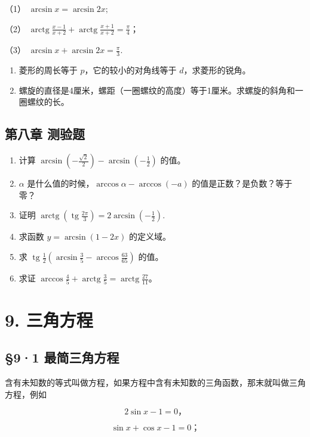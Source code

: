 （1） \(\arcsin x = \arcsin 2x;\)

（2）
\(\operatorname{arctg} \frac{x - 1}{x + 2} + \operatorname{arctg} \frac{x + 1}{x + 2} = \frac{\pi}{4}\)；

（3） \(\arcsin x + \arcsin 2x = \frac{\pi}{3}\).

\begin{enumerate}[start=8]
\item
  菱形的周长等于 \(p\)，它的较小的对角线等于 \(d\)，求菱形的锐角。
\item
  螺旋的直径是4厘米，螺距（一圈螺纹的高度）等于1厘米。求螺旋的斜角和一圈螺纹的长。
\end{enumerate}

\section{第八章 测验题}

\begin{enumerate}
\item
  计算
  \(\arcsin\left(-\frac{\sqrt{2}}{2}\right)-\arcsin\left(-\frac{1}{2}\right)\)
  的值。
\item
  \(\alpha\) 是什么值的时候，\(\arccos \alpha - \arccos (-a)\)
  的值是正数？是负数？等于零？
\item
  证明
  \(\operatorname{arctg}\left(\operatorname{tg}\frac{2\pi}{3}\right) = 2\arcsin\left(-\frac{1}{2}\right)\).
\item
  求函数 \(y = \arcsin(1 - 2x)\) 的定义域。
\item
  求
  \(\operatorname{tg} \frac{1}{2} (\arcsin \frac{3}{5} - \arccos \frac{63}{65})\)
  的值。
\item
  求证
  \(\arccos\frac45+\operatorname{arctg}\frac35=\operatorname{arctg}\frac{27}{11}\)。
\end{enumerate}

\chapter{9. 三角方程}

\section{§9·1 最简三角方程}

含有未知数的等式叫做方程，如果方程中含有未知数的三角函数，那末就叫做三角方程，例如

\[
2 \sin x - 1 = 0\text{，}
\]

\[
\sin x+\cos x-1=0\text{；}
\]

